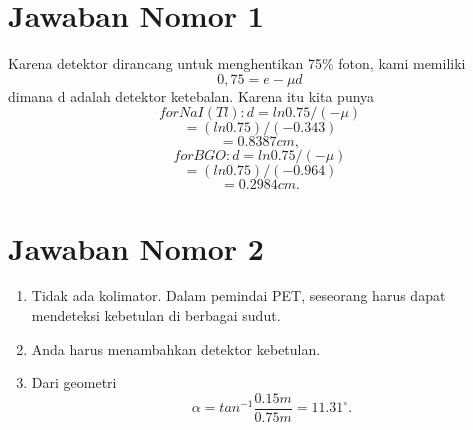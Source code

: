 \section{Jawaban Nomor 1}
Karena detektor dirancang untuk menghentikan 75\% foton, kami memiliki \begin{displaymath} 0,75 = e-\mu d\end{displaymath} dimana d adalah detektor ketebalan. Karena itu kita punya
\center
\begin{displaymath}
for NaI(Tl) : d = ln0.75/(-\mu) 
\end{displaymath}
\begin{displaymath}
= (ln0.75)/(-0.343) 
\end{displaymath}
\begin{displaymath}
= 0.8387 cm, 
\end{displaymath}
\begin{displaymath}
for BGO : d = ln0.75/(-\mu) 
\end{displaymath}
\begin{displaymath}
= (ln0.75)/(-0.964)
\end{displaymath} 
\begin{displaymath}
= 0.2984 cm.
\end{displaymath}
\section{Jawaban Nomor 2}
\begin{enumerate}
	\item Tidak ada kolimator. Dalam pemindai PET, seseorang harus dapat mendeteksi kebetulan di berbagai sudut.
	\item Anda harus menambahkan detektor kebetulan.
	\item Dari geometri \begin{displaymath}
				\alpha = tan^{-1}\frac {0.15 m}{0.75 m}
					= 11.31^\circ.
				\end{displaymath}
\end{enumerate}
